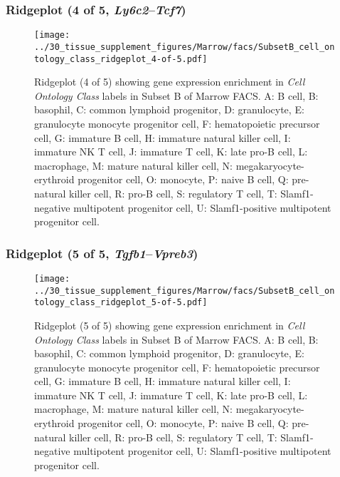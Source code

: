 \subsubsection{Ridgeplot (4 of 5, \emph{Ly6c2}--\emph{Tcf7})}
\begin{figure}[h]
\centering
\texttt{[image: ../30\_tissue\_supplement\_figures/Marrow/facs/SubsetB\_cell\_ontology\_class\_ridgeplot\_4-of-5.pdf]}

\caption{ Ridgeplot (4 of 5)  showing gene expression enrichment in \emph{Cell Ontology Class} labels in Subset B of Marrow FACS. A: B cell, B: basophil, C: common lymphoid progenitor, D: granulocyte, E: granulocyte monocyte progenitor cell, F: hematopoietic precursor cell, G: immature B cell, H: immature natural killer cell, I: immature NK T cell, J: immature T cell, K: late pro-B cell, L: macrophage, M: mature natural killer cell, N: megakaryocyte-erythroid progenitor cell, O: monocyte, P: naive B cell, Q: pre-natural killer cell, R: pro-B cell, S: regulatory T cell, T: Slamf1-negative multipotent progenitor cell, U: Slamf1-positive multipotent progenitor cell.}
\end{figure}


\clearpage

\subsubsection{Ridgeplot (5 of 5, \emph{Tgfb1}--\emph{Vpreb3})}
\begin{figure}[h]
\centering
\texttt{[image: ../30\_tissue\_supplement\_figures/Marrow/facs/SubsetB\_cell\_ontology\_class\_ridgeplot\_5-of-5.pdf]}

\caption{ Ridgeplot (5 of 5)  showing gene expression enrichment in \emph{Cell Ontology Class} labels in Subset B of Marrow FACS. A: B cell, B: basophil, C: common lymphoid progenitor, D: granulocyte, E: granulocyte monocyte progenitor cell, F: hematopoietic precursor cell, G: immature B cell, H: immature natural killer cell, I: immature NK T cell, J: immature T cell, K: late pro-B cell, L: macrophage, M: mature natural killer cell, N: megakaryocyte-erythroid progenitor cell, O: monocyte, P: naive B cell, Q: pre-natural killer cell, R: pro-B cell, S: regulatory T cell, T: Slamf1-negative multipotent progenitor cell, U: Slamf1-positive multipotent progenitor cell.}
\end{figure}


\clearpage

